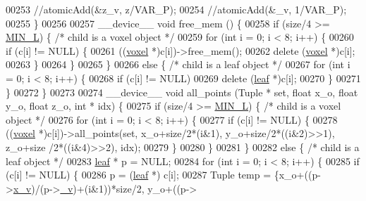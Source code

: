 \begin{DoxyCode}
{00253         \textcolor{comment}{//atomicAdd(&z\_v, z/VAR\_P);}
00254         \textcolor{comment}{//atomicAdd(&\_v, 1/VAR\_P);}
00255     \}
00256 
00257     \_\_device\_\_ \textcolor{keywordtype}{void} free\_mem () \{
00258         \textcolor{keywordflow}{if} (size/4 >= \hyperlink{Voxel_8hpp_a29d8f4bb35f9fa62e1d680bc6ab1f4f1}{MIN\_L}) \{ \textcolor{comment}{/* child is a voxel object */}
00259             \textcolor{keywordflow}{for} (\textcolor{keywordtype}{int} i = 0; i < 8; i++) \{
00260                 \textcolor{keywordflow}{if} (c[i] != NULL) \{
00261                     ((\hyperlink{classvoxel}{voxel} *)c[i])->free\_mem();
00262                     \textcolor{keyword}{delete} (\hyperlink{classvoxel}{voxel} *)c[i];
00263                 \}
00264             \}
00265         \}
00266         \textcolor{keywordflow}{else} \{ \textcolor{comment}{/* child is a leaf object */}
00267             \textcolor{keywordflow}{for} (\textcolor{keywordtype}{int} i = 0; i < 8; i++) \{
00268                 \textcolor{keywordflow}{if} (c[i] != NULL)
00269                     \textcolor{keyword}{delete} (\hyperlink{classleaf}{leaf} *)c[i];
00270             \}
00271         \}
00272     \}
00273 
00274     \_\_device\_\_ \textcolor{keywordtype}{void} all\_points (Tuple * \textcolor{keyword}{set}, \textcolor{keywordtype}{float} x\_o, \textcolor{keywordtype}{float} y\_o, \textcolor{keywordtype}{float} z\_o, \textcolor{keywordtype}{int} * idx) \{
00275         \textcolor{keywordflow}{if} (size/4 >= \hyperlink{Voxel_8hpp_a29d8f4bb35f9fa62e1d680bc6ab1f4f1}{MIN\_L}) \{ \textcolor{comment}{/* child is a voxel object */}
00276             \textcolor{keywordflow}{for} (\textcolor{keywordtype}{int} i = 0; i < 8; i++) \{
00277                 \textcolor{keywordflow}{if} (c[i] != NULL) \{
00278                     ((\hyperlink{classvoxel}{voxel} *)c[i])->all\_points(\textcolor{keyword}{set}, x\_o+size/2*(i&1), y\_o+size/2*((i&2)>>1), z\_o+size
      /2*((i&4)>>2), idx);
00279                 \}
00280             \}
00281         \}
00282         \textcolor{keywordflow}{else} \{ \textcolor{comment}{/* child is a leaf object */}
00283             \hyperlink{classleaf}{leaf} * p = NULL;
00284             \textcolor{keywordflow}{for} (\textcolor{keywordtype}{int} i = 0; i < 8; i++) \{
00285                 \textcolor{keywordflow}{if} (c[i] != NULL) \{
00286                     p = (\hyperlink{classleaf}{leaf} *) c[i];
00287                     Tuple temp = \{x\_o+((p->\hyperlink{classleaf_ac34a93ca5739928d7389b12e735252d4}{x\_v})/(p->\hyperlink{classleaf_a4fc347dbd4f5911bbb477910588ed512}{\_v})+(i&1))*size/2, y\_o+((p->
}
\end{DoxyCode}
